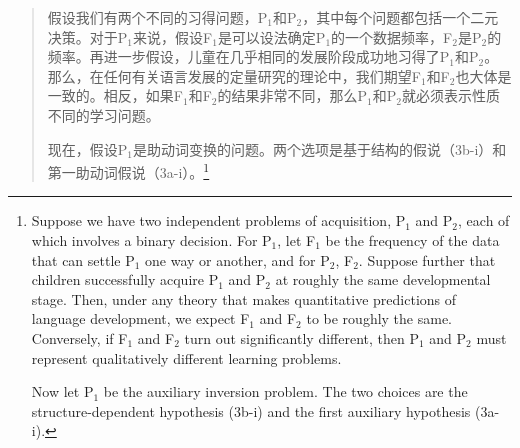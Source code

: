 \begin{quotation}
   假设我们有两个不同的习得问题，P$_1$和P$_2$，其中每个问题都包括一个二元决策。对于P$_1$来说，假设F$_1$是可以设法确定P$_1$的一个数据频率，F$_2$是P$_2$的频率。再进一步假设，儿童在几乎相同的发展阶段成功地习得了P$_1$和P$_2$。那么，在任何有关语言发展的定量研究的理论中，我们期望F$_1$和F$_2$也大体是一致的。相反，如果F$_1$和F$_2$的结果非常不同，那么P$_1$和P$_2$就必须表示性质不同的学习问题。 

现在，假设P$_1$是助动词变换的问题。两个选项是基于结构的假说（3b-i）和第一助动词假说（3a-i）。\citep[]{LY2002a}\footnote{%
   Suppose we have two independent problems of acquisition, P$_1$ and P$_2$, each
of which involves a binary decision. For P$_1$, let F$_1$ be the frequency of the
data that can settle P$_1$ one way or another, and for P$_2$, F$_2$. Suppose further
that children successfully acquire P$_1$ and P$_2$ at roughly the same developmental
stage. Then, under any theory that makes quantitative predictions of language
development, we expect F$_1$ and F$_2$ to be roughly the same. Conversely, if F$_1$ and
F$_2$ turn out significantly different, then P$_1$ and P$_2$ must represent qualitatively
different learning problems.

   Now let P$_1$ be the auxiliary inversion problem. The two choices are the
structure-dependent hypothesis (3b-i) and the first auxiliary hypothesis (3a-i). 
}
\end{quotation}

